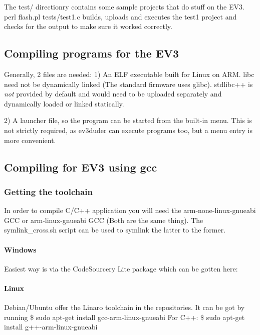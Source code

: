 The test/ directionry contains some sample projects that do stuff on the E\+V3. {\ttfamily perl flash.\+pl tests/test1.\+c} builds, uploads and executes the test1 project and checks for the output to make sure it worked correctly.

\subsection*{Compiling programs for the E\+V3}

Generally, 2 files are needed\+: 1) An E\+L\+F executable built for Linux on A\+R\+M. libc need not be dynamically linked (The standard firmware uses glibc). stdlibc++ is {\itshape not} provided by default and would need to be uploaded separately and dynamically loaded or linked statically.

2) A launcher file, so the program can be started from the built-\/in menu. This is not strictly required, as ev3duder can execute programs too, but a menu entry is more convenient.

\subsection*{Compiling for E\+V3 using gcc}

\subsubsection*{Getting the toolchain}

In order to compile C/\+C++ application you will need the arm-\/none-\/linux-\/gnueabi G\+C\+C or arm-\/linux-\/gnueabi G\+C\+C (Both are the same thing). The {\ttfamily symlink\+\_\+cross.\+sh} script can be used to symlink the latter to the former.

\paragraph*{Windows}

Easiest way is via the Code\+Sourcery Lite package which can be gotten here\+:

\paragraph*{Linux}

Debian/\+Ubuntu offer the Linaro toolchain in the repositories. It can be got by running \$ sudo apt-\/get install gcc-\/arm-\/linux-\/gnueabi For C++\+: \$ sudo apt-\/get install g++-\/arm-\/linux-\/gnueabi

